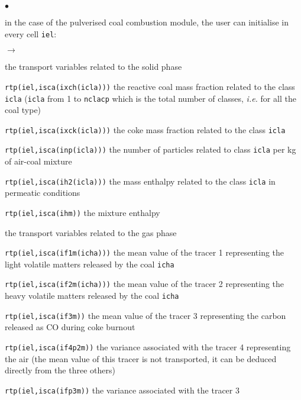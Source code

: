 {{{\begin{list}{$\bullet$}{}
        \item in the case of the pulverised coal combustion module, the
             user can initialise in every cell \texttt{iel}:
              \begin{list}{$\rightarrow$}{}
                     \item the transport variables related to the solid phase
                           \begin{list}{}{}
                                  \item \texttt{rtp(iel,isca(ixch(icla)))} the reactive coal mass fraction related to the class \texttt{icla} (\texttt{icla} from 1 to \texttt{nclacp} which is the total number of classes, {\em i.e.} for all the coal type)
                                  \item \texttt{rtp(iel,isca(ixck(icla)))} the coke mass fraction related to the class \texttt{icla}
                                  \item        \texttt{rtp(iel,isca(inp(icla)))} the number of particles related to class \texttt{icla} per kg of air-coal mixture
                                  \item \texttt{rtp(iel,isca(ih2(icla)))} the mass enthalpy related to the class \texttt{icla} in permeatic conditions
                           \end{list}
                     \item \texttt{rtp(iel,isca(ihm))} the mixture enthalpy
                     \item the transport variables related to the gas phase
                           \begin{list}{}{}
                                  \item
                                       \texttt{rtp(iel,isca(if1m(icha)))} the mean value of the tracer 1 representing the light volatile matters released by the coal \texttt{icha}
                                  \item
                                       \texttt{rtp(iel,isca(if2m(icha)))} the mean value of the tracer 2 representing the heavy volatile matters released by the coal \texttt{icha}
                                  \item \texttt{rtp(iel,isca(if3m))}
                                        the mean value of the tracer 3
                                        representing the carbon released
                                        as CO during coke burnout
                                  \item \texttt{rtp(iel,isca(if4p2m))} the variance associated with the tracer 4 representing the air (the mean value of this tracer is not transported, it can be deduced directly from the three others)
                                  \item \texttt{rtp(iel,isca(ifp3m))} the variance associated with the tracer 3
                           \end{list}
              \end{list}
\end{list}

}}}
